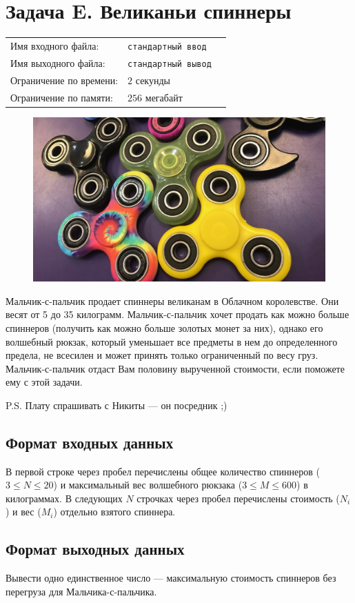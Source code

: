 \documentclass[12pt]{scrartcl}
\newcommand{\inputFile}{стандартный ввод}
\newcommand{\outputFile}{стандартный вывод}
\begin{document}
\newpage


\section*{Задача E. Великаньи спиннеры}

\begin{tabularx}{\textwidth}{l l X}
    Имя входного файла: & \texttt{\inputFile} \\
    Имя выходного файла: & \texttt{\outputFile} \\
    Ограничение по времени: & $2$ секунды \\
    Ограничение по памяти: & $256$ мегабайт \\
\end{tabularx}

\begin{figure}[h]
	\centering
    \includegraphics[width=0.6\linewidth]{spinner.jpeg}
\end{figure}

Мальчик-с-пальчик продает спиннеры великанам в Облачном королевстве.
Они весят от 5 до 35 килограмм. Мальчик-с-пальчик хочет продать как можно больше спиннеров (получить как можно больше золотых монет за них), однако его волшебный рюкзак,
который уменьшает все предметы в нем до определенного предела, не всесилен и может принять только ограниченный по весу груз.
Мальчик-с-пальчик отдаст Вам половину вырученной стоимости, если поможете ему с этой задачи.

P.S. Плату спрашивать с Никиты --- он посредник ;)
\subsection*{Формат входных данных}
В первой строке через пробел перечислены общее количество спиннеров ($3 \leq N \leq 20$) и максимальный вес волшебного рюкзака ($3 \leq M \leq 600$) в килограммах.
В следующих $N$ строчках через пробел перечислены стоимость ($N_i$) и вес ($M_i$) отдельно взятого спиннера.
\subsection*{Формат выходных данных}
Вывести одно единственное число --- максимальную стоимость спиннеров без перегруза для Мальчика-с-пальчика.
\end{document}
